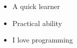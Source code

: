 


\twocolumnsection
{
	\begin{skills}
\end{skills}}
{
	\vspace{1em}
		\begin{itemize}
		\item A quick learner
		\item Practical ability                 
		\item I love programming
	\end{itemize}
}

